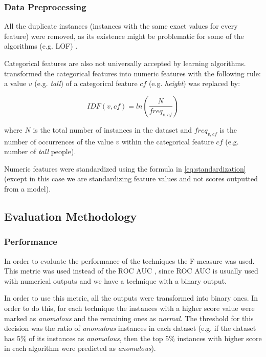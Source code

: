 \subsubsection{Data Preprocessing}

All the duplicate instances (instances with the same exact values for every feature) were removed, as its existence might be problematic for some of the algorithms (e.g. LOF) \cite{Campos2016}.

Categorical features are also not universally accepted by learning algorithms.
\textcite{Campos2016} transformed the categorical features into numeric features with the following rule: a value $v$ (e.g. \textit{tall}) of a categorical feature $cf$ (e.g. \textit{height}) was replaced by:

\begin{equation}
IDF(v,cf) = ln \left( \frac{N}{freq_{v,cf}} \right)
\end{equation}

where $N$ is the total number of instances in the dataset and $freq_{v,cf}$ is the number of occurrences of the value $v$ within the categorical feature $cf$ (e.g. number of \textit{tall} people).


Numeric features were standardized using the formula in \ref{eq:standardization} (except in this case we are standardizing feature values and not scores outputted from a model).

\subsection{Evaluation Methodology}

\subsubsection{Performance}\label{sec:studytechniqueperformance}

In order to evaluate the performance of the techniques the F-measure \cite{powers2011evaluation} was used.
This metric was used instead of the ROC AUC \cite{powers2011evaluation}, since ROC AUC is usually used with numerical outputs and we have a technique with a binary output.

In order to use this metric, all the outputs were transformed into binary ones.
In order to do this, for each technique the instances with a higher score value were marked as \textit{anomalous} and the remaining ones as \textit{normal}.
The threshold for this decision was the ratio of \textit{anomalous} instances in each dataset (e.g. if the dataset has 5\% of its instances as \textit{anomalous}, then the top 5\% instances with higher score in each algorithm were predicted as \textit{anomalous}).

